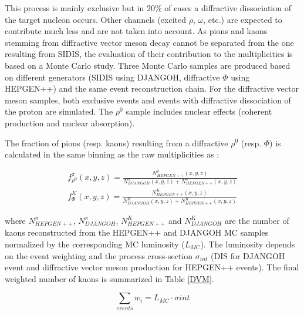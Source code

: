 \documentclass[letterpaper,12pt]{article}
\begin{document}
This process is mainly exclusive but in 20\% of cases a diffractive dissociation of the target nucleon occurs. Other channels (excited $\rho$, $\omega$, etc.)
are expected to contribute much less and are not taken into account. As pions and kaons stemming from diffractive
vector meson decay cannot be separated from the one resulting from SIDIS, the evaluation of their contribution to the multiplicities is based on a
Monte Carlo study. Three Monte Carlo samples are produced based on different generators (SIDIS using DJANGOH, diffractive $\Phi$ using HEPGEN++) and
the same event reconstruction chain. For the diffractive vector meson samples, both exclusive events and events with diffractive dissociation of the
proton are simulated. The $\rho^0$ sample includes nuclear effects (coherent production and nuclear absorption).

The fraction of pions (resp. kaons) resulting from a diffractive $\rho^0$ (resp. $\Phi$) is calculated in the same binning as the raw multiplicities as :

\begin{equation}
  \begin{split}
    f^{\pi}_{\rho^0}(x,y,z) = \frac{N^{\pi}_{HEPGEN++}(x,y,z)}{N^{\pi}_{DJANGOH}(x,y,z)+N^{\pi}_{HEPGEN++}(x,y,z)} \\
    f^K_{\Phi}(x,y,z) = \frac{N^K_{HEPGEN++}(x,y,z)}{N^K_{DJANGOH}(x,y,z)+N^K_{HEPGEN++}(x,y,z)}
  \end{split}
\end{equation}

where $N^{\pi}_{HEPGEN++}$, $N^{\pi}_{DJANGOH}$, $N^K_{HEPGEN++}$ and $N^K_{DJANGOH}$ are the number of kaons reconstructed from the HEPGEN++ and DJANGOH MC samples normalized by the corresponding
MC luminosity ($L_{MC}$). The luminosity depends on the event weighting and the process cross-section $\sigma_{int}$ (DIS for DJANGOH event and diffractive
vector meson production for HEPGEN++ events). The final weighted number of kaons is summarized in Table \ref{DVM}.

\begin{equation}
  \sum_{events} w_i = L_{MC} \cdot \sigma{int}
\end{equation}
\end{document}
